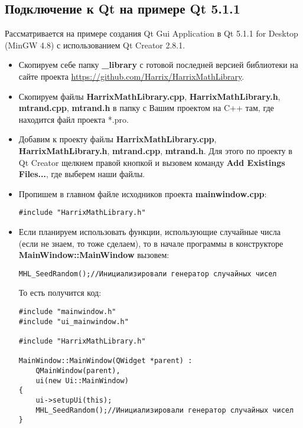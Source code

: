 \subsection{Подключение к Qt на примере Qt 5.1.1}

Рассматривается на примере создания Qt Gui Application в Qt 5.1.1 for Desktop (MinGW 4.8) с использованием Qt Creator 2.8.1.

\begin{itemize}
\item Скопируем себе папку \textbf{\_library} с готовой последней версией библиотеки на сайте проекта \href{https://github.com/Harrix/HarrixMathLibrary}{https://github.com/Harrix/HarrixMathLibrary}.

\item Скопируем файлы \textbf{HarrixMathLibrary.cpp}, \textbf{HarrixMathLibrary.h}, \textbf{mtrand.cpp}, \textbf{mtrand.h} в папку с Вашим проектом на C++ там, где находится файл проекта *.pro.

\item Добавим к проекту файлы \textbf{HarrixMathLibrary.cpp}, \textbf{HarrixMathLibrary.h}, \textbf{mtrand.cpp}, \textbf{mtrand.h}. Для этого по проекту в Qt Creator щелкнем правой кнопкой и вызовем команду \textbf{Add Existings Files...}, где выберем наши файлы.

\item Пропишем в главном файле исходников проекта \textbf{mainwindow.cpp}:
\begin{lstlisting}[label=install_01_qt,caption=Подключение библиотеки]
#include "HarrixMathLibrary.h"
\end{lstlisting}

\item Если планируем использовать функции, использующие случайные числа (если не знаем, то тоже сделаем), то в начале программы в конструкторе \textbf{MainWindow::MainWindow} вызовем:
\begin{lstlisting}[label=install_02_qt,caption=Инициализация генератора случайных чисел]
MHL_SeedRandom();//Инициализировали генератор случайных чисел
\end{lstlisting}

То есть получится код:
\begin{lstlisting}[label=install_03_qt,caption=Пример файла mainwindow.cpp с подключенной библиотекой]
#include "mainwindow.h"
#include "ui_mainwindow.h"

#include "HarrixMathLibrary.h"

MainWindow::MainWindow(QWidget *parent) :
    QMainWindow(parent),
    ui(new Ui::MainWindow)
{
    ui->setupUi(this);
    MHL_SeedRandom();//Инициализировали генератор случайных чисел    
}


\end{lstlisting}
\end{itemize}
